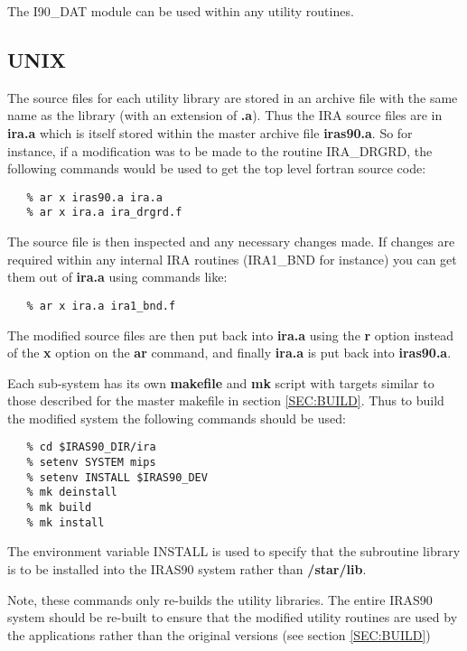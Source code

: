 The {\small I90\_DAT} module can be used within any utility routines.

\subsection{UNIX}
The source files for each utility library are stored in an archive file with the
same name as the library (with an extension of {\bf .a}). Thus the {\small IRA}
source files are in {\bf ira.a} which is itself stored within the master archive
file {\bf iras90.a}. So for instance, if a modification was to be made to the
routine {\small IRA\_DRGRD}, the following commands would be used to get the
top level fortran source code:

\small
\begin{verbatim}
   % ar x iras90.a ira.a
   % ar x ira.a ira_drgrd.f
\end{verbatim}
\normalsize

The source file is then inspected and any necessary changes made. If changes are
required within any internal {\small IRA} routines ({\small IRA1\_BND} for
instance) you can get them out of {\bf ira.a} using commands like:

\small
\begin{verbatim}
   % ar x ira.a ira1_bnd.f
\end{verbatim}
\normalsize

The modified source files are then put back into {\bf ira.a} using the {\bf r}
option instead of the {\bf x} option on the {\bf ar} command, and finally {\bf
ira.a} is put back into {\bf iras90.a}.

Each sub-system has its own {\bf makefile} and {\bf mk} script with targets
similar to those described for the master makefile in section \ref{SEC:BUILD}.
Thus to build the modified system the following commands should be used:

\small
\begin{verbatim}
   % cd $IRAS90_DIR/ira
   % setenv SYSTEM mips
   % setenv INSTALL $IRAS90_DEV
   % mk deinstall
   % mk build
   % mk install
\end{verbatim}
\normalsize

The environment variable {\small INSTALL} is used to specify that the subroutine
library is to be installed into the {\small IRAS90} system rather than {\bf
/star/lib}.

Note, these commands only re-builds the utility libraries. The entire {\small
IRAS90} system should be re-built to ensure that the modified utility routines
are used by the applications rather than the original versions (see section
\ref{SEC:BUILD})

